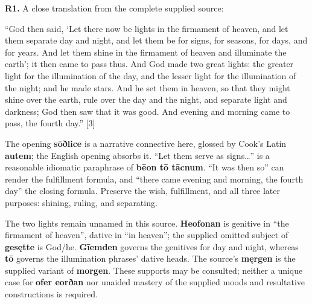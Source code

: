 \par\begin{minipage}{\linewidth}\raggedright
\textbf{R1.} A close translation from the complete supplied source:

“God then said, ‘Let there now be lights in the firmament of heaven, and let them separate day and night, and let them be for signs, for seasons, for days, and for years. And let them shine in the firmament of heaven and illuminate the earth’; it then came to pass thus. And God made two great lights: the greater light for the illumination of the day, and the lesser light for the illumination of the night; and he made stars. And he set them in heaven, so that they might shine over the earth, rule over the day and the night, and separate light and darkness; God then saw that it was good. And evening and morning came to pass, the fourth day.” [3]

The opening \textbf{sōðlice} is a narrative connective here, glossed by Cook’s Latin \textbf{autem}; the English opening absorbs it. “Let them serve as signs…” is a reasonable idiomatic paraphrase of \textbf{bēon tō tācnum}. “It was then so” can render the fulfillment formula, and “there came evening and morning, the fourth day” the closing formula. Preserve the wish, fulfillment, and all three later purposes: shining, ruling, and separating.

The two lights remain unnamed in this source. \textbf{Heofonan} is genitive in “the firmament of heaven”, dative in “in heaven”; the supplied omitted subject of \textbf{gesętte} is God/\allowbreak{}he. \textbf{Gīemden} governs the genitives for day and night, whereas \textbf{tō} governs the illumination phrases’ dative heads. The source’s \textbf{męrgen} is the supplied variant of \textbf{morgen}. These supports may be consulted; neither a unique case for \textbf{ofer eorðan} nor unaided mastery of the supplied moods and resultative constructions is required.

\end{minipage}\par\addvspace{4pt}

